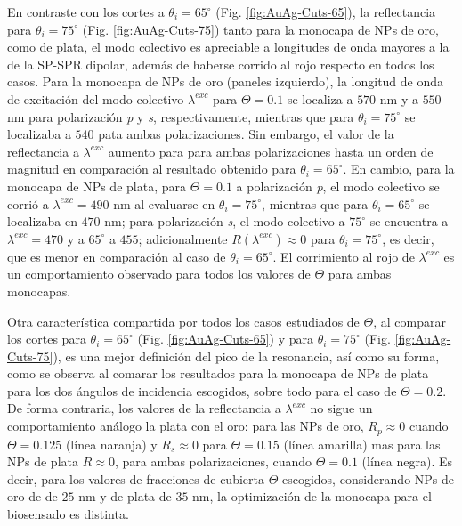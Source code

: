 En contraste con los cortes a $\theta_i=65^\circ$ (Fig. \ref{fig:AuAg-Cuts-65}), la reflectancia para $\theta_i=75^\circ$ (Fig. \ref{fig:AuAg-Cuts-75}) tanto para la monocapa de NPs de oro, como de plata, el modo colectivo es apreciable a longitudes de onda mayores a la de la SP-SPR dipolar, además de haberse corrido al rojo respecto en todos los casos. Para la monocapa de NPs de oro (paneles izquierdo), la longitud de onda de excitación del modo colectivo $\lambda^{exc}$ para $\Theta=0.1$ se localiza a $570$ nm y a $550$ nm para polarización \emph{p} y \emph{s}, respectivamente, mientras que para $\theta_i=75^\circ$ se localizaba a $540$ pata ambas polarizaciones. Sin embargo, el valor de la reflectancia a $\lambda^{exc}$ aumento para para ambas polarizaciones hasta un orden de magnitud en comparación al resultado obtenido para $\theta_i=65^\circ$. En cambio, para la monocapa de NPs de plata, para $\Theta=0.1$ a polarización \emph{p}, el modo colectivo se corrió a $\lambda^{exc}=490$ nm al evaluarse en $\theta_i=75^\circ$, mientras que para $\theta_i=65^\circ$ se localizaba en $470$ nm; para polarización \emph{s}, el modo colectivo a $75^\circ$ se encuentra a $\lambda^{exc}=470$ y a $65^\circ$ a $455$; adicionalmente $R(\lambda^{exc})\approx 0$ para $\theta_i=75^\circ$, es decir, que es menor en comparación al caso de $\theta_i=65^\circ$. El corrimiento al rojo de $\lambda^{exc}$ es un comportamiento observado para todos los valores de $\Theta$ para ambas monocapas.

Otra característica compartida por todos los casos estudiados de $\Theta$, al comparar los cortes para $\theta_i=65^\circ$ (Fig. \ref{fig:AuAg-Cuts-65}) y para $\theta_i=75^\circ$ (Fig. \ref{fig:AuAg-Cuts-75}), es una mejor definición del pico de la resonancia, así como su forma, como se observa al comarar los resultados para la monocapa de NPs de plata para los dos ángulos de incidencia escogidos, sobre todo para el caso de $\Theta=0.2$. De forma contraria, los valores de la reflectancia a $\lambda^{exc}$ no sigue un comportamiento análogo la plata con el oro: para las NPs de oro, $R_p\approx 0$ cuando $\Theta=0.125$ (línea naranja) y $R_s\approx 0$ para $\Theta=0.15$ (línea amarilla) mas para las NPs de plata $R\approx 0$, para ambas polarizaciones, cuando $\Theta=0.1$ (línea negra). Es decir, para los valores de fracciones de cubierta $\Theta$ escogidos, considerando NPs de oro de de $25$ nm y de plata de $35$ nm, la optimización de la monocapa para el biosensado es distinta.

